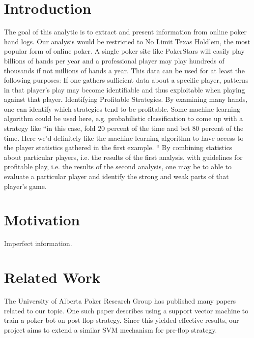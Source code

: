 \documentclass[twoside]{article}
\begin{document}
\begin{multicols}{2} %

\section{Introduction} 
The goal of this analytic is to extract and present information from online poker hand logs. Our analysis would be restricted to No Limit Texas Hold'em, the most popular form of online poker. A single poker site like PokerStars will easily play billions of hands per year and a professional player may play hundreds of thousands if not millions of hands a year. This data can be used for at least the following purposes:
If one gathers sufficient data about a specific player, patterns in that player's play may become identifiable and thus exploitable when playing against that player.
Identifying Profitable Strategies. By examining many hands, one can identify which strategies tend to be profitable. Some machine learning algorithm could be used here, e.g. probabilistic classification to come up with a strategy like ``in this case, fold 20 percent of the time and bet 80 percent of the time. Here we'd definitely like the machine learning algorithm to have access to the player statistics gathered in the first example. ``
By combining statistics about particular players, i.e. the results of the first analysis, with guidelines for profitable play, i.e. the results of the second analysis, one may be to able to evaluate a particular player and identify the strong and weak parts of that player's game.



\section{Motivation}

Imperfect information.


\section{Related Work}

The University of Alberta Poker Research Group has published many papers related to our topic.
One such paper describes using a support vector machine to train a poker bot on post-flop strategy. Since this yielded effective results, our project aims to extend a similar SVM mechanism for pre-flop strategy.


\end{multicols}
\end{document}
